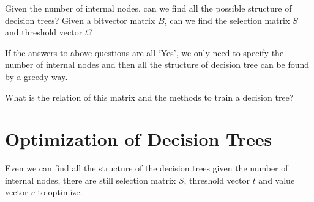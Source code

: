 \documentclass[UTF8]{article}
\begin{document}
Given the number of internal nodes,
can we find all the possible structure of decision trees?
Given a bitvector matrix $B$, can we find the selection matrix $S$ and threshold vector $t$?

If the answers to above questions are all `Yes',
we only need to specify the number of internal nodes
and then all the structure of  decision tree can be found by a greedy way.

What is the relation of this matrix and the methods to train a decision tree?

\section{Optimization of Decision Trees}

Even  we can find all the structure of the decision trees given the number of internal nodes,
there are still selection matrix $S$, threshold vector $t$ and value vector $v$ to optimize.
\end{document}

